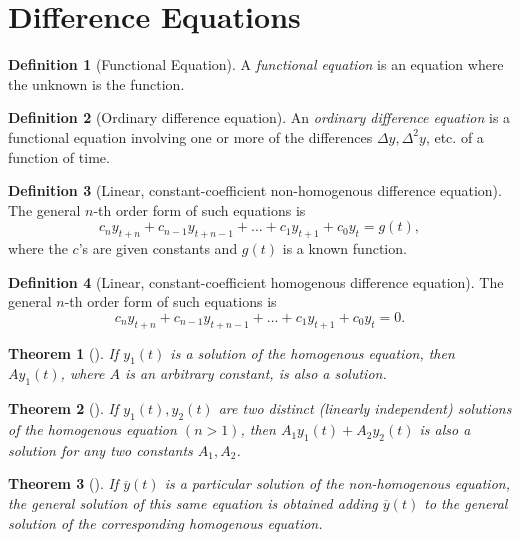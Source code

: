 \documentclass{article}
\newtheorem{theorem}{Theorem}
\theoremstyle{definition}
\newtheorem{definition}{Definition}
\theoremstyle{Solution}
\begin{document}
\section{Difference Equations}

\begin{definition}[Functional Equation]
A \textit{functional equation} is an equation where the unknown is the function.
\end{definition}

\begin{definition}[Ordinary difference equation]
An \textit{ordinary difference equation} is a functional equation involving one or more of the differences $\Delta y, \Delta^2y$, etc. of a function of time.
\end{definition}

\begin{definition}[Linear, constant-coefficient non-homogenous difference equation]
The general $n$-th order form of such equations is
\begin{equation}
	c_ny_{t+n}+c_{n-1}y_{t+n-1}+...+c_{1}y_{t+1}+c_{0}y_{t}=g(t),
\end{equation}
where the $c$'s are given constants and $g(t)$ is a known function.
\end{definition}

\begin{definition}[Linear, constant-coefficient homogenous difference equation]
The general $n$-th order form of such equations is
\begin{equation}
	c_ny_{t+n}+c_{n-1}y_{t+n-1}+...+c_{1}y_{t+1}+c_{0}y_{t}=0.
\end{equation}
\end{definition}

\begin{theorem}[]
If $y_1(t)$ is a solution of the homogenous equation, then $Ay_1(t)$, where $A$ is an arbitrary constant, is also a solution.
\end{theorem}

\begin{theorem}[]
If $y_1(t), y_2(t)$ are two distinct (linearly independent) solutions of the homogenous equation $(n>1)$, then $A_1y_1(t)+A_2y_2(t)$ is also a solution for any two constants $A_1, A_2$.
\end{theorem}

\begin{theorem}[]
If $\overline{y}(t)$ is a particular solution of the non-homogenous equation, the general solution of this same equation is obtained adding $\overline{y}(t)$ to the general solution of the corresponding homogenous equation.
\end{theorem}
\end{document}
